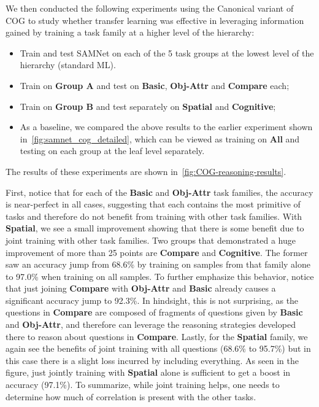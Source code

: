 We then conducted the following experiments using the Canonical variant of COG to study 
whether transfer learning was effective in leveraging information gained by training a task family at a higher level
of the hierarchy:
 \begin{itemize}
 	\compresslist
	\item Train and test SAMNet on each of the 5 task groups at the lowest level of the hierarchy (standard ML). 
	\item Train on \textbf{Group A} and test on \textbf{Basic}, \textbf{Obj-Attr} and \textbf{Compare} each;
	\item Train on \textbf{Group B} and test separately on \textbf{Spatial} and \textbf{Cognitive};
	\item As a baseline, we compared the above results to the earlier experiment shown in~\cref{fig:samnet_cog_detailed}, which
	can be viewed as training on \textbf{All} and testing on each group at the leaf level separately.
\end{itemize}

The results of these experiments are shown in~\cref{fig:COG-reasoning-results}.

First, notice that for each of the \textbf{Basic} and \textbf{Obj-Attr} task families, the accuracy is near-perfect in all cases, suggesting that each contains the most primitive of tasks and therefore do not benefit from training with other task families.
With \textbf{Spatial}, we see a small improvement showing that there is some benefit due to joint training with other task families.
Two groups that demonstrated a huge improvement of more than 25 points are \textbf{Compare} and \textbf{Cognitive}.
The former saw an accuracy jump from 68.6\% by training on samples from that family alone
to 97.0\% when training on all samples. To further emphasize this behavior, notice that 
just joining \textbf{Compare} with \textbf{Obj-Attr} and \textbf{Basic} already causes a significant accuracy jump to 92.3\%. 
In hindsight, this is not surprising, as the questions in \textbf{Compare} are composed
of fragments of questions given by \textbf{Basic} and \textbf{Obj-Attr}, and therefore can leverage the reasoning strategies developed there to reason about questions in \textbf{Compare}.
Lastly, for the \textbf{Spatial} family, we again see the benefits of joint training with all questions (68.6\% to 95.7\%) but in this case there
is a slight loss incurred by including everything. As seen in the figure, just jointly training with \textbf{Spatial} alone is sufficient to get a boost in accuracy (97.1\%). To summarize, while joint training helps, one needs to determine how much of correlation is present with the other tasks.

